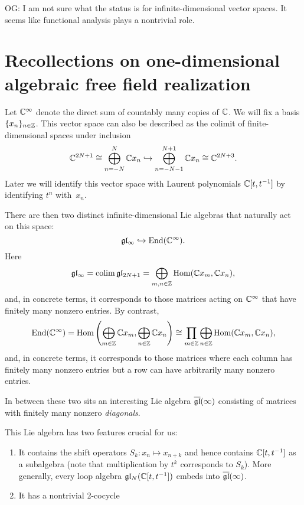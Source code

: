 \documentclass[11pt]{amsart}
\DeclareMathOperator{\colim}{colim}
\def\owen#1{{\textcolor{violet!65!black}{OG: {#1}}}}
\begin{document}
\owen{I am not sure what the status is for infinite-dimensional vector spaces. It seems like functional analysis plays a nontrivial role.}

\section{Recollections on one-dimensional algebraic free field realization}

Let $\mathbb C^\infty$ denote the direct sum of countably many copies of $\mathbb C$.
We will fix a basis $\{x_n\}_{n \in \mathbb Z}$.
This vector space can also be described as the colimit of finite-dimensional spaces under inclusion 
\[
\mathbb C^{2N+1} \cong \bigoplus_{n = -N}^N \mathbb C x_n \hookrightarrow \bigoplus_{n = -N-1}^{N+1} \mathbb C x_n \cong \mathbb C^{2N+3}.
\]
Later we will identify this vector space with Laurent polynomials $\mathbb C[t,t^{-1}]$ by identifying $t^n$ with~$x_n$.

There are then two distinct infinite-dimensional Lie algebras that naturally act on this space:
\[
\mathfrak{g} \mathfrak{l}_\infty \hookrightarrow {\rm End}(\mathbb C^\infty).
\]
Here
\[
\gl_\infty = \colim \gl_{2N+1} = \bigoplus_{m,n \in \ZZ} \Hom(\CC x_m, \CC x_n),
\]
and, in concrete terms, it corresponds to those matrices acting on $\mathbb C^\infty$ that have finitely many nonzero entries.
By contrast, 
\[
{\rm End}(\mathbb C^\infty) = {\rm Hom} \left(\bigoplus_{m \in \mathbb Z} \mathbb C x_m, \bigoplus_{n \in \mathbb Z} \mathbb C x_n \right) \cong \prod_{m\in \mathbb Z} \bigoplus_{n \in \mathbb Z} {\rm Hom}(\mathbb C x_m, \mathbb C x_n),
\]
and, in concrete terms, it corresponds to those matrices where each column has finitely many nonzero entries but a row can have arbitrarily many nonzero entries.

In between these two sits an interesting Lie algebra $\overline{\mathfrak{g} \mathfrak{l}}(\infty)$ consisting of matrices with finitely many nonzero {\em diagonals}.

This Lie algebra has two features crucial for us:
\begin{enumerate}
\item It contains the shift operators $S_k: x_n \mapsto x_{n+k}$ and hence contains $\mathbb C[t,t^{-1}]$ as a subalgebra (note that multiplication by $t^k$ corresponds to $S_k$). More generally, every loop algebra $\mathfrak{g} \mathfrak{l}_N(\mathbb C[t,t^{-1}])$ embeds into $\overline{\mathfrak{g} \mathfrak{l}}(\infty)$.
\item It has a nontrivial 2-cocycle
\end{enumerate}
\end{document}
